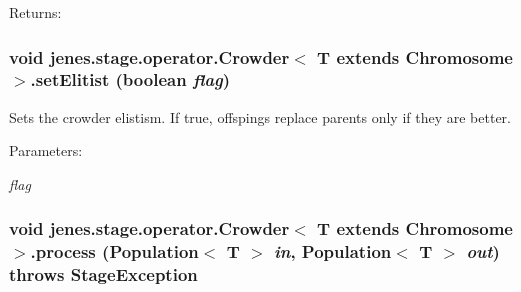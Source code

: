 \begin{Desc}
\item[Returns:]\end{Desc}
\hypertarget{classjenes_1_1stage_1_1operator_1_1_crowder_3_01_t_01extends_01_chromosome_01_4_d995907f114cdd40eb03d53f05734b8c}{
\subsubsection[setElitist]{\setlength{\rightskip}{0pt plus 5cm}void jenes.stage.operator.Crowder$<$ T extends Chromosome $>$.setElitist (boolean {\em flag})}}
\label{classjenes_1_1stage_1_1operator_1_1_crowder_3_01_t_01extends_01_chromosome_01_4_d995907f114cdd40eb03d53f05734b8c}


Sets the crowder elistism. If true, offspings replace parents only if they are better.

\begin{Desc}
\item[Parameters:]
\begin{description}
\item[{\em flag}]\end{description}
\end{Desc}
\hypertarget{classjenes_1_1stage_1_1operator_1_1_crowder_3_01_t_01extends_01_chromosome_01_4_21f0859b05e06d7ee4b979d5a2d559d7}{
\subsubsection[process]{\setlength{\rightskip}{0pt plus 5cm}void jenes.stage.operator.Crowder$<$ T extends Chromosome $>$.process (Population$<$ T $>$ {\em in}, \/  Population$<$ T $>$ {\em out})  throws {\bf StageException} }}
\label{classjenes_1_1stage_1_1operator_1_1_crowder_3_01_t_01extends_01_chromosome_01_4_21f0859b05e06d7ee4b979d5a2d559d7}


